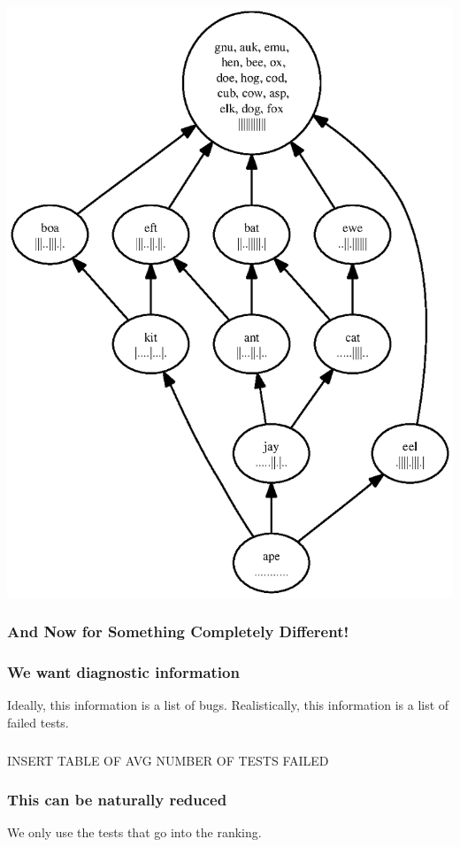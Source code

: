 \documentclass[svgnames]{beamer}
\theoremstyle{definition}
\begin{document}
\begin{frame}
\centerline{\includegraphics[height=\textheight]{success.ps}}
\end{frame}

\begin{frame}
\frametitle{And Now for Something Completely Different!}
\end{frame}

\begin{frame}
\frametitle{We want diagnostic information}
Ideally, this information is a list of bugs.
\newline\newline
Realistically, this information is a list of failed tests.
\end{frame}

\begin{frame}
\frametitle{}
INSERT TABLE OF AVG NUMBER OF TESTS FAILED
\end{frame}

\begin{frame}
\frametitle{This can be naturally reduced}
We only use the tests that go into the ranking.
\end{frame}
\end{document}
